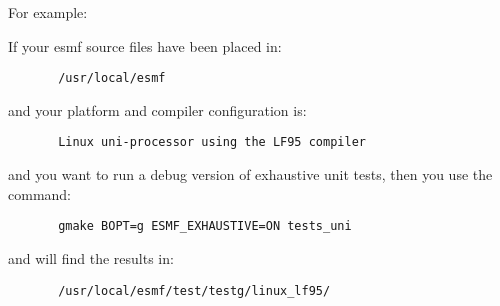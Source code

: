 For example: 

If your esmf source files have been placed in: 
\begin{verbatim}
       /usr/local/esmf
\end{verbatim}

and your platform and compiler configuration is:
\begin{verbatim}
       Linux uni-processor using the LF95 compiler
\end{verbatim}

and you want to run a debug version of exhaustive unit tests,
then you use the command:
\begin{verbatim}
       gmake BOPT=g ESMF_EXHAUSTIVE=ON tests_uni
\end{verbatim}

and will find the results in:
\begin{verbatim}
       /usr/local/esmf/test/testg/linux_lf95/
\end{verbatim}

